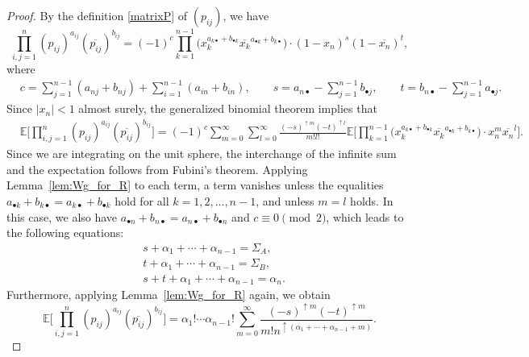 \documentclass[pdftex]{sigma}
\numberwithin{equation}{section}
\theoremstyle{definition}
\begin{document}
\begin{proof}
By the definition \eqref{matrixP} of $(p_{ij})$, we have
\[
\prod_{i,j=1}^n (p_{ij})^{a_{ij}} (\overline{p_{ij}})^{b_{ij}}
= (-1)^c
\prod_{k=1}^{n-1}
\bigl( x_k^{a_{k \bullet}+b_{\bullet k}} \overline{x_k}^{a_{\bullet k} +b_{k \bullet}} \bigr)
\cdot (1-x_n)^{s} (1-\overline{x_n})^{t},
\]
where
\begin{align*}
&c= \sum_{j=1}^{n-1} (a_{nj}+b_{nj}) + \sum_{i=1}^{n-1} (a_{in}+b_{in}), \qquad
s = a_{n \bullet} -\sum_{j=1}^{n-1} b_{\bullet j}, \qquad
t = b_{n \bullet} -\sum_{j=1}^{n-1} a_{\bullet j}.
\end{align*}
Since $|x_n|<1$ almost surely,
the generalized binomial theorem implies that
\begin{align*}
&\mathbb{E} \Biggl[ \prod_{i,j=1}^n (p_{ij})^{a_{ij}} (\overline{p_{ij}})^{b_{ij}} \Biggr]
 = (-1)^{c}
 \sum_{m=0}^\infty\sum_{l=0}^\infty\frac{(-s)^{\uparrow m}(-t)^{\uparrow l}}{m! l! }
\mathbb{E} \Biggl[\prod_{k=1}^{n-1} \bigl( x_k^{a_{k \bullet}+b_{\bullet k}}
\overline{x_k}^{a_{\bullet k}+b_{k \bullet}} \bigr)
\cdot x_n^{m} \overline{x_n}^{l} \Biggr].
\end{align*}
Since we are integrating on the unit sphere, the interchange of the infinite sum and the expectation follows from Fubini's theorem.
Applying Lemma~\ref{lem:Wg_for_R} to each term, a term vanishes unless the equalities
$a_{\bullet k} + b_{k \bullet} = a_{k \bullet} + b_{\bullet k }$ hold for all $k=1,2,\dots,n-1$, and unless $m=l$ holds.
In this case, we also have $a_{\bullet n} + b_{n \bullet} = a_{n \bullet} + b_{\bullet n}$ and
$c \equiv 0 \pmod{2}$, which leads to the following equations:
\begin{equation} \label{eq:alpha_Sigma}
\begin{aligned}
&s+\alpha_1+ \cdots+ \alpha_{n-1}= \Sigma_A, \\
&t+\alpha_1+ \cdots+ \alpha_{n-1}= \Sigma_B, \\
&s+t+\alpha_1+ \cdots+ \alpha_{n-1}= \alpha_n.
\end{aligned}
\end{equation}
Furthermore, applying Lemma~\ref{lem:Wg_for_R} again, we obtain
\[
\mathbb{E} \Biggl[ \prod_{i,j=1}^n (p_{ij})^{a_{ij}} (\overline{p_{ij}})^{b_{ij}} \Biggr]
= \alpha_1 ! \cdots \alpha_{n-1}! \sum_{m=0}^\infty \frac{(-s)^{\uparrow m}(-t)^{\uparrow m}}{m! n^{\uparrow (\alpha_1+ \cdots+ \alpha_{n-1}+m)}}.
\]


\end{proof}
\end{document}

